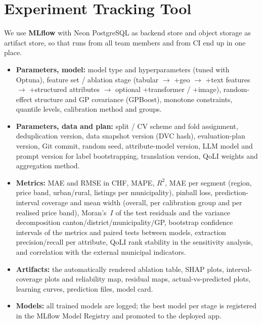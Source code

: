 \documentclass[11pt,a4paper]{article}
\begin{document}
\section{Experiment Tracking Tool}
We use \textbf{MLflow} with Neon PostgreSQL as backend store and object storage as artifact store, so that runs from all team members and from CI end up in one place.
\begin{itemize}
    \item \textbf{Parameters, model:} model type and hyperparameters (tuned with Optuna), feature set / ablation stage (tabular $\rightarrow$ +geo $\rightarrow$ +text features $\rightarrow$ +structured attributes $\rightarrow$ optional +transformer / +image), random-effect structure and GP covariance (GPBoost), monotone constraints, quantile levels, calibration method and groups.
    \item \textbf{Parameters, data and plan:} split / CV scheme and fold assignment, deduplication version, data snapshot version (DVC hash), evaluation-plan version, Git commit, random seed, attribute-model version, LLM model and prompt version for label bootstrapping, translation version, QoLI weights and aggregation method.
    \item \textbf{Metrics:} MAE and RMSE in CHF, MAPE, $R^2$, MAE per segment (region, price band, urban/rural, listings per municipality), pinball loss, prediction-interval coverage and mean width (overall, per calibration group and per realised price band), Moran's~$I$ of the test residuals and the variance decomposition canton/district/municipality/GP, bootstrap confidence intervals of the metrics and paired tests between models, extraction precision/recall per attribute, QoLI rank stability in the sensitivity analysis, and correlation with the external municipal indicators.
    \item \textbf{Artifacts:} the automatically rendered ablation table, SHAP plots, interval-coverage plots and reliability map, residual maps, actual-vs-predicted plots, learning curves, prediction files, model card.
    \item \textbf{Models:} all trained models are logged; the best model per stage is registered in the MLflow Model Registry and promoted to the deployed app.
\end{itemize}
\end{document}
